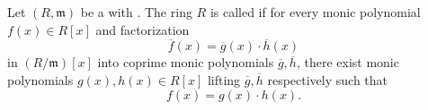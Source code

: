 \begin{definition} \label{definition:henselian_ring}
Let $(R, \mathfrak{m})$ be a  with . The ring $R$ is called  if for every monic polynomial $f(x) \in R[x]$ and factorization
$$ \overline{f}(x) = \overline{g}(x) \cdot \overline{h}(x) $$
in $(R/\mathfrak{m})[x]$ into coprime monic polynomials $\overline{g}, \overline{h}$, there exist monic polynomials $g(x), h(x) \in R[x]$ lifting $\overline{g}, \overline{h}$ respectively such that
$$ f(x) = g(x) \cdot h(x).  $$
\end{definition}